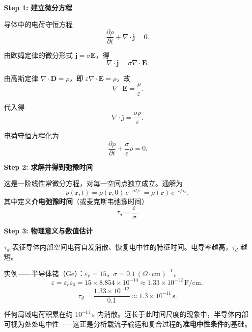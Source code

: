 \begin{derivationbox}[标准解题过程]
\textbf{Step 1: 建立微分方程}

导体中的电荷守恒方程
\begin{equation}
\frac{\partial\rho}{\partial t}+\nabla\cdot\bm{j}=0.
\end{equation}

由欧姆定律的微分形式 $\bm{j}=\sigma\bm{E}$，得
\begin{equation}
\nabla\cdot\bm{j}=\sigma\nabla\cdot\bm{E}.
\end{equation}

由高斯定律 $\nabla\cdot\bm{D}=\rho$，即 $\varepsilon\nabla\cdot\bm{E}=\rho$，故
\begin{equation}
\nabla\cdot\bm{E}=\frac{\rho}{\varepsilon}.
\end{equation}

代入得
\begin{equation}
\nabla\cdot\bm{j}=\frac{\sigma\rho}{\varepsilon}.
\end{equation}

电荷守恒方程化为
\begin{equation}
\frac{\partial\rho}{\partial t}+\frac{\sigma}{\varepsilon}\rho=0.
\end{equation}

\textbf{Step 2: 求解并得到弛豫时间}

这是一阶线性常微分方程，对每一空间点独立成立。通解为
\begin{equation}
\rho(\bm{r},t)=\rho(\bm{r},0)\,e^{-\sigma t/\varepsilon}=\rho(\bm{r})\,e^{-t/\tau_d},
\end{equation}
其中定义\textbf{介电弛豫时间}（或麦克斯韦弛豫时间）
\begin{equation}
\boxed{\tau_d=\frac{\varepsilon}{\sigma}.}
\end{equation}

\textbf{Step 3: 物理意义与数值估计}

$\tau_d$ 表征导体内部空间电荷自发消散、恢复电中性的特征时间。电导率越高，$\tau_d$ 越短。

实例——半导体锗（Ge）：$\varepsilon_r=15$，$\sigma=0.1\,(\Omega\cdot\text{cm})^{-1}$，
\begin{equation}
\varepsilon=\varepsilon_r\varepsilon_0=15\times8.854\times10^{-14}\approx1.33\times10^{-12}\,\text{F/cm},
\end{equation}
\begin{equation}
\tau_d=\frac{1.33\times10^{-12}}{0.1}\approx1.3\times10^{-11}\,\text{s}.
\end{equation}

任何局域电荷积累在约 $10^{-11}\,$s 内消散。远长于此时间尺度的现象中，半导体内部可视为处处电中性——这正是分析载流子输运和复合过程的\textbf{准电中性条件}的基础。
\end{derivationbox}

